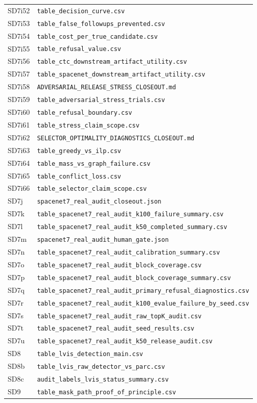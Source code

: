 \documentclass[11pt]{article}
\begin{document}
\begin{longtable}{ll}
SD7i52 & \texttt{table\_decision\_curve.csv} \\
SD7i53 & \texttt{table\_false\_followups\_prevented.csv} \\
SD7i54 & \texttt{table\_cost\_per\_true\_candidate.csv} \\
SD7i55 & \texttt{table\_refusal\_value.csv} \\
SD7i56 & \texttt{table\_ctc\_downstream\_artifact\_utility.csv} \\
SD7i57 & \texttt{table\_spacenet\_downstream\_artifact\_utility.csv} \\
SD7i58 & \texttt{ADVERSARIAL\_RELEASE\_STRESS\_CLOSEOUT.md} \\
SD7i59 & \texttt{table\_adversarial\_stress\_trials.csv} \\
SD7i60 & \texttt{table\_refusal\_boundary.csv} \\
SD7i61 & \texttt{table\_stress\_claim\_scope.csv} \\
SD7i62 & \texttt{SELECTOR\_OPTIMALITY\_DIAGNOSTICS\_CLOSEOUT.md} \\
SD7i63 & \texttt{table\_greedy\_vs\_ilp.csv} \\
SD7i64 & \texttt{table\_mass\_vs\_graph\_failure.csv} \\
SD7i65 & \texttt{table\_conflict\_loss.csv} \\
SD7i66 & \texttt{table\_selector\_claim\_scope.csv} \\
SD7j & \texttt{spacenet7\_real\_audit\_closeout.json} \\
SD7k & \texttt{table\_spacenet7\_real\_audit\_k100\_failure\_summary.csv} \\
SD7l & \texttt{table\_spacenet7\_real\_audit\_k50\_completed\_summary.csv} \\
SD7m & \texttt{spacenet7\_real\_audit\_human\_gate.json} \\
SD7n & \texttt{table\_spacenet7\_real\_audit\_calibration\_summary.csv} \\
SD7o & \texttt{table\_spacenet7\_real\_audit\_block\_coverage.csv} \\
SD7p & \texttt{table\_spacenet7\_real\_audit\_block\_coverage\_summary.csv} \\
SD7q & \texttt{table\_spacenet7\_real\_audit\_primary\_refusal\_diagnostics.csv} \\
SD7r & \texttt{table\_spacenet7\_real\_audit\_k100\_evalue\_failure\_by\_seed.csv} \\
SD7s & \texttt{table\_spacenet7\_real\_audit\_raw\_topK\_audit.csv} \\
SD7t & \texttt{table\_spacenet7\_real\_audit\_seed\_results.csv} \\
SD7u & \texttt{table\_spacenet7\_real\_audit\_k50\_release\_audit.csv} \\
SD8 & \texttt{table\_lvis\_detection\_main.csv} \\
SD8b & \texttt{table\_lvis\_raw\_detector\_vs\_parc.csv} \\
SD8c & \texttt{audit\_labels\_lvis\_status\_summary.csv} \\
SD9 & \texttt{table\_mask\_path\_proof\_of\_principle.csv}
\end{longtable}
\endgroup
\end{document}
